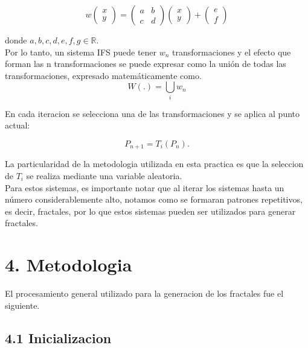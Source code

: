 \documentclass[12pt,a4paper]{article}
\begin{document}
\begin{equation}
    w
\begin{pmatrix}
    x\\
    y
\end{pmatrix}
=
\begin{pmatrix}
    a & b\\
    c & d
\end{pmatrix}
\begin{pmatrix}
    x\\
    y
\end{pmatrix}
+
\begin{pmatrix}
    e\\
    f
\end{pmatrix}
\end{equation}


donde $a,b,c,d,e,f,g \in \mathbb{R}.$ \\

Por lo tanto, un sistema IFS puede tener $w_n$ transformaciones y el efecto que forman las n transformaciones se puede expresar como la unión de todas las transformaciones, expresado matemáticamente
como. 
\begin{equation}
    W(.)= \bigcup_{i} w_n
\end{equation}


En cada iteracion se selecciona una de las transformaciones y se aplica al punto actual:

\begin{equation}
    P_{n+1}=T_i(P_n).
\end{equation}

La particularidad de la metodologia utilizada en esta practica es que la seleccion de $T_i$ se realiza mediante una variable aleatoria.\\

Para estos sistemas, es importante notar que al iterar los sistemas hasta un número considerablemente alto, notamos como se formaran patrones repetitivos, es decir, fractales, por lo que estos sistemas pueden
ser utilizados para generar fractales.

\section*{4. Metodologia}

El procesamiento general utilizado para la generacion de los fractales fue el siguiente.

\subsection*{4.1 Inicializacion}
\end{document}
